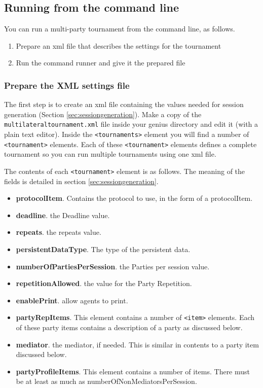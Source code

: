 \documentclass[]{article}
\begin{document}
\subsection{Running from the command line}
You can run a multi-party tournament from the command line, as follows.

\begin{enumerate}
\item Prepare an xml file that describes the settings for the tournament
\item Run the command runner and give it the prepared file 
\end{enumerate}

\subsubsection{Prepare the XML settings file}
The first step is to create an xml file containing the values needed for session generation (Section \ref{sec:sessiongeneration}).
Make a copy of the \verb|multilateraltournament.xml| file inside your genius directory and edit it (with a plain text editor).  Inside the \verb|<tournaments>| element you will find a number of \verb|<tournament>| elements. Each of these \verb|<tournament>| elements defines a complete tournament so you can run multiple tournaments using one xml file.

The contents of each \verb|<tournament>| element is as follows. The meaning of the fields is detailed in section \ref{sec:sessiongeneration}.

\begin{itemize}
\item \textbf{protocolItem}. Contains the protocol to use, in the form of a protocolItem.
\item \textbf{deadline}.  the Deadline value.
\item \textbf{repeats}. the repeats value. 
\item \textbf{persistentDataType}. The type of the persistent data.
\item \textbf{numberOfPartiesPerSession}. the Parties per session value.
\item  \textbf{repetitionAllowed}. the value for the Party Repetition. 
\item  \textbf{enablePrint}. allow agents to print. 
\item \textbf{partyRepItems}. This element contains a number of \verb|<item>| elements. Each of these party items contains a description of a party as discussed below.
\item \textbf{mediator}. the mediator, if needed. This is similar in contents to a party item discussed below. 
 \item \textbf{partyProfileItems}. This element contains a number of items. There must be at least as much as numberOfNonMediatorsPerSession. 
 \end{itemize}
\end{document}
